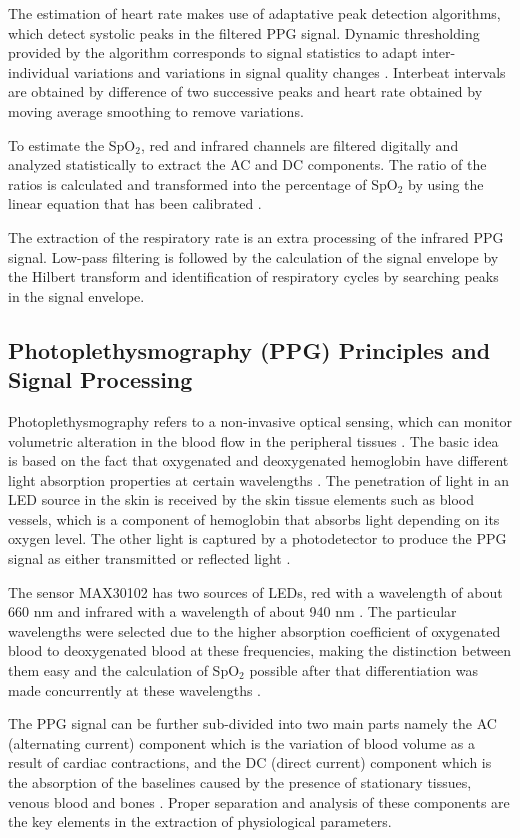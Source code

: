 \documentclass{ieeeaccess}
\begin{document}
The estimation of heart rate makes use of adaptative peak detection algorithms, which detect systolic peaks in the filtered PPG signal. Dynamic thresholding provided by the algorithm corresponds to signal statistics to adapt inter-individual variations and variations in signal quality changes \cite{b24}. Interbeat intervals are obtained by difference of two successive peaks and heart rate obtained by moving average smoothing to remove variations.

To estimate the SpO$_2$, red and infrared channels are filtered digitally and analyzed statistically to extract the AC and DC components. The ratio of the ratios is calculated and transformed into the percentage of SpO$_2$ by using the linear equation that has been calibrated \cite{b25}.

The extraction of the respiratory rate is an extra processing of the infrared PPG signal. Low-pass filtering is followed by the calculation of the signal envelope by the Hilbert transform and identification of respiratory cycles by searching peaks in the signal envelope.

\subsection{Photoplethysmography (PPG) Principles and Signal Processing}

Photoplethysmography refers to a non-invasive optical sensing, which can monitor volumetric alteration in the blood flow in the peripheral tissues \cite{b9}. The basic idea is based on the fact that oxygenated and deoxygenated hemoglobin have different light absorption properties at certain wavelengths \cite{b10}. The penetration of light in an LED source in the skin is received by the skin tissue elements such as blood vessels, which is a component of hemoglobin that absorbs light depending on its oxygen level. The other light is captured by a photodetector to produce the PPG signal as either transmitted or reflected light \cite{b11}.

The sensor MAX30102 has two sources of LEDs, red with a wavelength of about 660 nm and infrared with a wavelength of about 940 nm \cite{b12}. The particular wavelengths were selected due to the higher absorption coefficient of oxygenated blood to deoxygenated blood at these frequencies, making the distinction between them easy and the calculation of SpO$_2$ possible after that differentiation was made concurrently at these wavelengths \cite{b13}.

The PPG signal can be further sub-divided into two main parts namely the AC (alternating current) component which is the variation of blood volume as a result of cardiac contractions, and the DC (direct current) component which is the absorption of the baselines caused by the presence of stationary tissues, venous blood and bones \cite{b14}. Proper separation and analysis of these components are the key elements in the extraction of physiological parameters.
\end{document}
